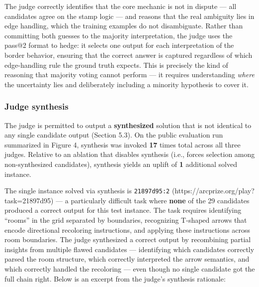 \documentclass[11pt]{article}
\begin{document}
The judge correctly identifies that the core mechanic is not in dispute
--- all candidates agree on the stamp logic --- and reasons that the
real ambiguity lies in edge handling, which the training examples do not
disambiguate. Rather than committing both guesses to the majority
interpretation, the judge uses the pass@2 format to hedge: it selects
one output for each interpretation of the border behavior, ensuring that
the correct answer is captured regardless of which edge-handling rule
the ground truth expects. This is precisely the kind of reasoning that
majority voting cannot perform --- it requires understanding
\emph{where} the uncertainty lies and deliberately including a minority
hypothesis to cover it.

\hypertarget{judge-synthesis}{%
\subsubsection{Judge synthesis}\label{judge-synthesis}}

The judge is permitted to output a \textbf{synthesized} solution that is
not identical to any single candidate output (Section 5.3). On the
public evaluation run summarized in Figure 4, synthesis was invoked
\textbf{17} times total across all three judges. Relative to an ablation
that disables synthesis (i.e., forces selection among non-synthesized
candidates), synthesis yields an uplift of \textbf{1} additional solved
instance.

The single instance solved via synthesis is \texttt{21897d95:2}
(https://arcprize.org/play?task=21897d95) --- a particularly difficult
task where \textbf{none} of the 29 candidates produced a correct output
for this test instance. The task requires identifying ``rooms'' in the
grid separated by boundaries, recognizing T-shaped arrows that encode
directional recoloring instructions, and applying these instructions
across room boundaries. The judge synthesized a correct output by
recombining partial insights from multiple flawed candidates ---
identifying which candidates correctly parsed the room structure, which
correctly interpreted the arrow semantics, and which correctly handled
the recoloring --- even though no single candidate got the full chain
right. Below is an excerpt from the judge's synthesis rationale:
\end{document}
